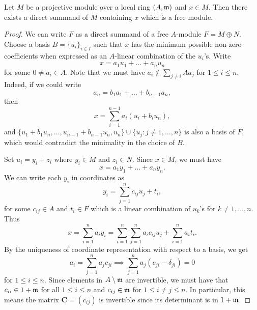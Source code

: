 \begin{lemma}
    Let $M$ be a projective module over a local ring $(A,\mathfrak{m})$ and $x\in M$. Then there exists a direct summand of $M$ containing $x$ which is a free module.
\end{lemma}
\begin{proof}
    We can write $F$ as a direct summand of a free $A$-module $F = M\oplus N$. Choose a basis $B = \{u_i\}_{i\in I}$ such that $x$ has the minimum possible non-zero coefficients when expressed as an $A$-linear combination of the $u_i$'s. Write 
    \begin{equation*}
        x = a_1 u_1 + \dots + a_nu_n
    \end{equation*}
    for some $0\ne a_i\in A$. Note that we must have $a_i\notin\sum\limits_{j\ne i} Aa_j$ for $1\le i\le n$. Indeed, if we could write 
    \begin{equation*}
        a_n = b_1a_1 + \dots + b_{n - 1}a_n, 
    \end{equation*}
    then 
    \begin{equation*}
        x = \sum_{i = 1}^{n - 1}a_i(u_i + b_iu_n),
    \end{equation*}
    and $\{u_1 + b_1u_n,\dots,u_{n - 1} + b_{n - 1}u_n, u_n\}\cup\{u_j\colon j\ne 1,\dots,n\}$ is also a basis of $F$, which would contradict the minimality in the choice of $B$.

    Set $u_i = y_i + z_i$ where $y_i\in M$ and $z_i\in N$. Since $x\in M$, we must have 
    \begin{equation*}
        x = a_1y_1 + \dots + a_ny_n.
    \end{equation*}
    We can write each $y_i$ in coordinates as 
    \begin{equation*}
        y_i = \sum_{j = 1}^n c_{ij}u_j + t_i,
    \end{equation*}
    for some $c_{ij}\in A$ and $t_i\in F$ which is a linear combination of $u_k$'s for $k\ne 1,\dots, n$. Thus 
    \begin{equation*}
        x = \sum_{i = 1}^n a_iy_i = \sum_{i = 1}^n\sum_{j = 1}^n a_i c_{ij}u_j + \sum_{i = 1}^n a_it_i.
    \end{equation*}
    By the uniqueness of coordinate representation with respect to a basis, we get 
    \begin{equation*}
        a_i = \sum_{j = 1}^n a_j c_{ji}\implies\sum_{j = 1}^n a_j\left(c_{ji} - \delta_{ji}\right) = 0
    \end{equation*}
    for $1\le i\le n$. Since elements in $A\setminus\mathfrak{m}$ are invertible, we must have that $c_{ii}\in 1 + \mathfrak{m}$ for all $1\le i\le n$ and $c_{ij}\in\mathfrak{m}$ for $1\le i\ne j\le n$. In particular, this means the matrix $\mathbf C = \left(c_{ij}\right)$ is invertible since its determinant is in $1 + \mathfrak{m}$.


\end{proof}
